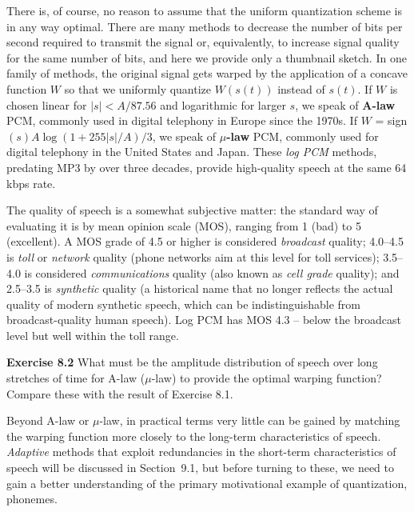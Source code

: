 There is, of course, no reason to assume that the uniform quantization scheme
is in any way optimal. There are many methods to decrease the number of bits
per second required to transmit the signal or, equivalently, to increase
signal quality for the same number of bits, and here we provide only a
thumbnail sketch. In one family of methods, the original signal gets warped by
the application of a concave function $W$ so that we uniformly quantize
$W(s(t))$ instead of $s(t)$. If $W$ is chosen linear for $|s|<A/87.56$ and
logarithmic for larger $s$, we speak of {\bf A-law} PCM, commonly used in
digital telephony in Europe since the 1970s. If $W$ =
sign$(s)A\log(1+255|s|/A)/3$, we speak of {\bf $\mu$-law} PCM, commonly used
for digital telephony in the United States and Japan. These {\it log
  PCM} methods, predating MP3 by over three decades, provide
high-quality speech at the same 64 kbps rate.  

The quality of speech is a somewhat subjective matter: the standard way of
evaluating it is by mean opinion scale (MOS),
ranging from 1 (bad) to 5 (excellent). A MOS grade of 4.5 or higher is
considered {\it broadcast} quality; 4.0--4.5 is {\it toll} or {\it network}
quality (phone networks aim at this level for toll
services); 3.5--4.0 is considered {\it communications} quality (also known as
{\it cell grade} quality); and 2.5--3.5 is {\it synthetic} quality (a
historical name that no longer reflects the actual quality of modern synthetic
speech, which can be indistinguishable from broadcast-quality human speech).
Log PCM has MOS 4.3 -- below the broadcast level but well within the toll
range.  

\smallskip 
\noindent 
{\bf Exercise 8.2} What must be the amplitude distribution of speech over long
stretches of time for A-law ($\mu$-law) to provide the optimal warping
function? Compare these with the result of Exercise 8.1. 

\smallskip
\noindent
Beyond A-law or $\mu$-law, in practical terms very little can be gained by
matching the warping function more closely to the long-term characteristics of
speech. {\it Adaptive} methods that exploit redundancies in the short-term
characteristics of speech will be discussed in Section~9.1, but before turning
to these, we need to gain a better understanding of the primary motivational
example of quantization, phonemes. 

